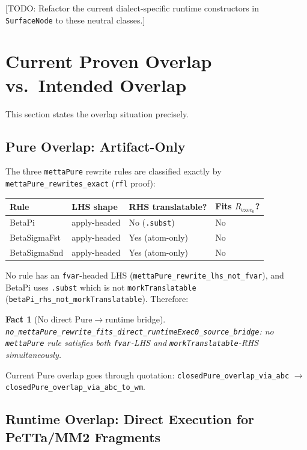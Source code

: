 \documentclass[11pt]{article}
\newtheorem{fact}[theorem]{Fact}
\theoremstyle{remark}
\newcommand{\code}[1]{\texttt{#1}}
\newcommand{\leanref}[1]{\texttt{#1}}
\newcommand{\TODO}[1]{\textcolor{red!60!black}{[TODO: #1]}}
\begin{document}
\TODO{Refactor the current dialect-specific runtime constructors in
\code{SurfaceNode} to these neutral classes.}

\section{Current Proven Overlap vs.\ Intended Overlap}
\label{sec:overlap}

This section states the overlap situation precisely.

\subsection{Pure Overlap: Artifact-Only}

The three \code{mettaPure} rewrite rules are classified exactly by
\leanref{mettaPure\_rewrites\_exact} (\code{rfl} proof):

\begin{center}
\small
\begin{tabular}{@{}llll@{}}
\toprule
Rule & LHS shape & RHS translatable? & Fits $R_{\mathrm{exec}_0}$? \\
\midrule
BetaPi & apply-headed & No (\code{.subst}) & No \\
BetaSigmaFst & apply-headed & Yes (atom-only) & No \\
BetaSigmaSnd & apply-headed & Yes (atom-only) & No \\
\bottomrule
\end{tabular}
\end{center}

\noindent
No rule has an \code{fvar}-headed LHS
(\leanref{mettaPure\_rewrite\_lhs\_not\_fvar}),
and BetaPi uses \code{.subst} which is not \leanref{morkTranslatable}
(\leanref{betaPi\_rhs\_not\_morkTranslatable}).
Therefore:

\begin{fact}[No direct Pure$\to$runtime bridge]
\leanref{no\_mettaPure\_rewrite\_fits\_direct\_runtimeExec0\_source\_bridge}:
no \code{mettaPure} rule satisfies both \code{fvar}-LHS and
\leanref{morkTranslatable}-RHS simultaneously.
\end{fact}

\noindent
Current Pure overlap goes through quotation:
\leanref{closedPure\_overlap\_via\_abc} $\to$
\leanref{closedPure\_overlap\_via\_abc\_to\_wm}.

\subsection{Runtime Overlap: Direct Execution for PeTTa/MM2 Fragments}
\end{document}
